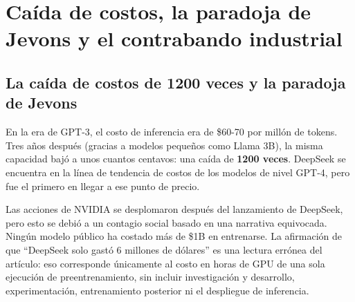 \section{Caída de costos, la paradoja de Jevons y el contrabando industrial}

\subsection{La caída de costos de 1200 veces y la paradoja de Jevons}

En la era de GPT-3, el costo de inferencia era de \$60-70 por millón de tokens. Tres años después (gracias a modelos pequeños como Llama 3B), la misma capacidad bajó a unos cuantos centavos: una caída de \textbf{1200 veces}. DeepSeek se encuentra en la línea de tendencia de costos de los modelos de nivel GPT-4, pero fue el primero en llegar a ese punto de precio.

Las acciones de NVIDIA se desplomaron después del lanzamiento de DeepSeek, pero esto se debió a un contagio social basado en una narrativa equivocada. Ningún modelo público ha costado más de \$1B en entrenarse. La afirmación de que ``DeepSeek solo gastó 6 millones de dólares'' es una lectura errónea del artículo: eso corresponde únicamente al costo en horas de GPU de una sola ejecución de preentrenamiento, sin incluir investigación y desarrollo, experimentación, entrenamiento posterior ni el despliegue de inferencia.

